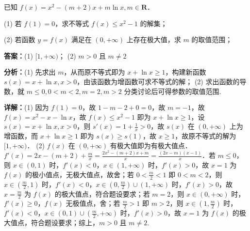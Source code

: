 \begin{question}[points=14]
已知 $f(x) = x^2 - (m+2)x + m\ln x, m \in \mathbf{R}$．

(1) 若 $f(1) = 0$，求不等式 $f(x) \leq x^2 - 1$ 的解集；

(2) 若函数 $y = f(x)$ 满足在 $(0, +\infty)$ 上存在极大值，求 $m$ 的取值范围；
\begin{solution}
\textbf{答案：}(1) $[1, +\infty)$； (2) $m > 0$ 且 $m \neq 2$

\textbf{分析：}(1) 先求出 $m$，从而原不等式即为 $x + \ln x \geq 1$，构建新函数 $s(x) = x + \ln x, x > 0$，由该函数为增函数可求不等式的解； (2) 求出函数的导数，就 $m \leq 0, 0 < m < 2, m = 2, m > 2$ 分类讨论后可得参数的取值范围.

\textbf{详解：}(1) 因为 $f(1) = 0$，故 $1 - m - 2 + 0 = 0$，故 $m = -1$，故 $f(x) = x^2 - x - \ln x$，故 $f(x) \leq x^2 - 1$ 即为 $x + \ln x \geq 1$，设 $s(x) = x + \ln x, x > 0$，则 $s'(x) = 1 + \frac{1}{x} > 0$，故 $s(x)$ 在 $(0, +\infty)$ 上为增函数，而 $x + \ln x \geq 1$ 即为 $s(x) \geq s(1)$，故 $x \geq 1$，故原不等式的解为 $[1, +\infty)$．
(2) $f(x)$ 在 $(0, +\infty)$ 有极大值即为有极大值点．$f'(x) = 2x - (m+2) + \frac{m}{x} = \frac{2x^2 - (m+2)x + m}{x} = \frac{(2x - m)(x - 1)}{x}$．若 $m \leq 0$，则 $x \in (0,1)$ 时，$f'(x) < 0$，$x \in (1, +\infty)$ 时，$f'(x) > 0$，故 $x = 1$ 为 $f(x)$ 的极小值点，无极大值点，故舍；若 $0 < \frac{m}{2} < 1$ 即 $0 < m < 2$，则 $x \in \left(\frac{m}{2}, 1\right)$ 时，$f'(x) < 0$，$x \in \left(0, \frac{m}{2}\right) \cup (1, +\infty)$ 时，$f'(x) > 0$，故 $x = \frac{m}{2}$ 为 $f(x)$ 的极大值点，符合题设要求；若 $m = 2$，则 $x \in (0, +\infty)$ 时，$f'(x) \geq 0$，$f(x)$ 无极值点，舍；若 $\frac{m}{2} > 1$ 即 $m > 2$，则 $x \in \left(1, \frac{m}{2}\right)$ 时，$f'(x) < 0$，$x \in (0,1) \cup \left(\frac{m}{2}, +\infty\right)$ 时，$f'(x) > 0$，故 $x = 1$ 为 $f(x)$ 的极大值点，符合题设要求；综上，$m > 0$ 且 $m \neq 2$.
\end{solution}
\end{question}

